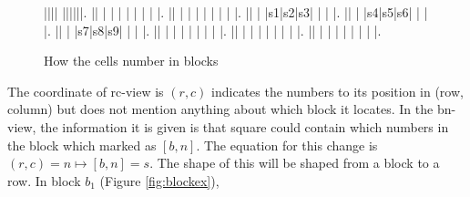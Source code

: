 \documentclass[11pt]{report}
\begin{document}
\begin{figure}[htbp]
\begin{sudoku}
 |{}|{}|{}| {}|{}|{}|{}|{}|{}|.
 |{}| | | | | | | | |.
 |{}| | | | | | | | |.
 |{}| | |{\LARGE s1}|{\LARGE s2}|{\LARGE s3}| | | |.
 |{}| | |{\LARGE s4}|{\LARGE s5}|{\LARGE s6}| | | |.
 |{}| | |{\LARGE s7}|{\LARGE s8}|{\LARGE s9}| | | |.
 |{}| | | | | | | | |.
 |{}| | | | | | | | |.
 |{}| | | | | | | | |.
\end{sudoku}
\caption{How the cells number in blocks}
\label{fig:squres}
\end{figure}

The coordinate of rc-view is $(r, c)$ indicates the numbers to its position in (row, column) but does not mention anything about which block it locates. In the bn-view, the information it is given is that square could contain which numbers in the block which marked as $[b, n]$. The equation for this change is $(r, c) = n \mapsto [b, n] = s$. The shape of this will be shaped from a block to a row. In block $b_{1}$ (Figure \ref{fig:blockex}), 
\end{document}
